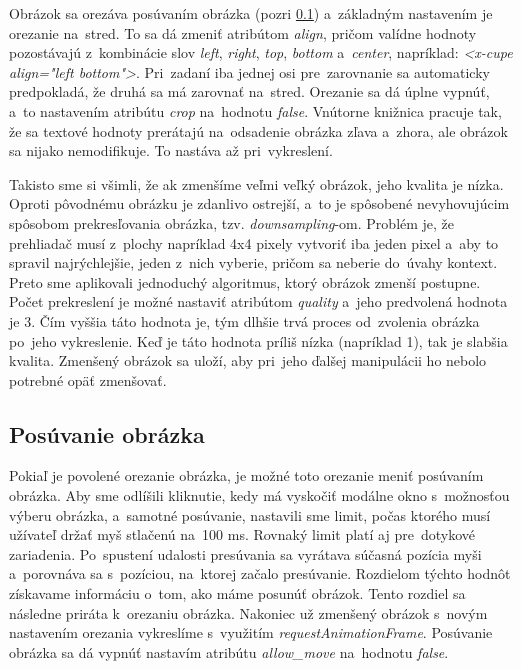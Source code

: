 Obrázok sa orezáva posúvaním obrázka (pozri \ref{sec:posuvanie-obrazka}) a~základným nastavením je orezanie na~stred. To sa dá zmeniť atribútom \emph{align}, pričom valídne hodnoty pozostávajú z~kombinácie slov \emph{left}, \emph{right}, \emph{top}, \emph{bottom} a~\emph{center}, napríklad: \emph{<x-cupe align="left bottom"\textgreater}. Pri~zadaní iba jednej osi pre~zarovnanie sa automaticky predpokladá, že druhá sa má zarovnať na~stred. Orezanie sa dá úplne vypnúť, a~to nastavením atribútu \emph{crop} na~hodnotu \emph{false}. Vnútorne knižnica pracuje tak, že sa textové hodnoty prerátajú na~odsadenie obrázka zľava a~zhora, ale obrázok sa nijako nemodifikuje. To nastáva až pri~vykreslení.

Takisto sme si všimli, že ak zmenšíme veľmi veľký obrázok, jeho kvalita je nízka. Oproti pôvodnému obrázku je zdanlivo ostrejší, a~to je spôsobené nevyhovujúcim spôsobom prekresľovania obrázka, tzv. \emph{downsampling}-om. Problém je, že prehliadač musí z~plochy napríklad 4x4 pixely vytvoriť iba jeden pixel a~aby to spravil najrýchlejšie, jeden z~nich vyberie, pričom sa neberie do~úvahy kontext. Preto sme aplikovali jednoduchý algoritmus, ktorý obrázok zmenší postupne. Počet prekreslení je možné nastaviť atribútom \emph{quality} a~jeho predvolená hodnota je 3. Čím vyššia táto hodnota je, tým dlhšie trvá proces od~zvolenia obrázka po~jeho vykreslenie. Keď je táto hodnota príliš nízka (napríklad 1), tak je slabšia kvalita. Zmenšený obrázok sa uloží, aby pri~jeho ďalšej manipulácii ho nebolo potrebné opäť zmenšovať.

\subsection{Posúvanie obrázka}
\label{sec:posuvanie-obrazka}

Pokiaľ je povolené orezanie obrázka, je možné toto orezanie meniť posúvaním obrázka. Aby sme odlíšili kliknutie, kedy má vyskočiť modálne okno s~možnosťou výberu obrázka, a~samotné posúvanie, nastavili sme limit, počas ktorého musí užívateľ držať myš stlačenú na~100 ms. Rovnaký limit platí aj pre~dotykové zariadenia. Po~spustení udalosti presúvania sa vyrátava súčasná pozícia myši a~porovnáva sa s~pozíciou, na~ktorej začalo presúvanie. Rozdielom týchto hodnôt získavame informáciu o~tom, ako máme posunúť obrázok. Tento rozdiel sa následne priráta k~orezaniu obrázka. Nakoniec už zmenšený obrázok s~novým nastavením orezania vykreslíme s~využitím \emph{requestAnimationFrame}. Posúvanie obrázka sa dá vypnúť nastavím atribútu \emph{allow\_move} na~hodnotu \emph{false}.

